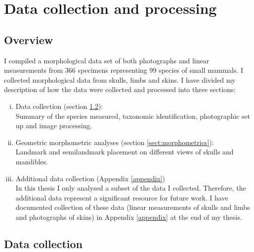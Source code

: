 
\chapter{Data collection and processing}
\label{chap:methods}



\section{Overview}

	I compiled a morphological data set of both photographs and linear measurements from 366 specimens representing 99 species of small mammals. 
	I collected morphological data from skulls, limbs and skins. I have divided my description of how the data were collected and processed into three sections:
	
	\begin{enumerate}[i.]
	
	\item Data collection (section \ref{sect:datacollection}): \\
	Summary of the species measured, taxonomic identification, photographic set up and image processing.
	
	\item Geometric morphometric analyses (section \ref{sect:morphometrics}):\\
	Landmark and semilandmark placement on different views of skulls and mandibles.
	
	
	\item Additional data collection (Appendix \ref{appendix}) \\
	In this thesis I only analysed a subset of the data I collected. Therefore, the additional data represent a significant resource for future work. I have documented collection of these data (linear measurements of skulls and limbs and photographs of skins) in Appendix \ref{appendix} at the end of my thesis.

	\end{enumerate} 


\section{Data collection}
\label{sect:datacollection}


\subsection{}

